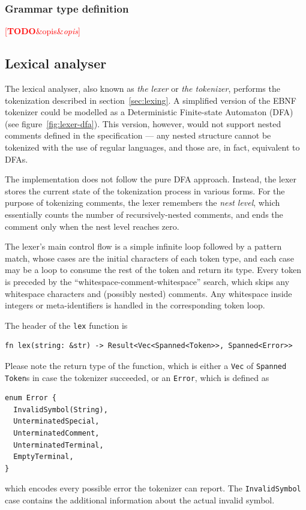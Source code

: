 \documentclass[english,engineering]{wizthesis}
\newcommand{\todo}[1]{%
  \textcolor{red}{[\textbf{TODO}\ifx&#1&{}\else{ }\fi\emph{#1}]}%
}
\begin{document}
\subsubsection*{Grammar type definition}


\todo{opis}

\subsection{Lexical analyser}

The lexical analyser, also known as \emph{the lexer} or \emph{the tokenizer},
performs the tokenization described in section~\ref{sec:lexing}. A simplified
version of the EBNF tokenizer could be modelled as a Deterministic Finite-state
Automaton (DFA) (see figure~\ref{fig:lexer-dfa}). This version, however, would
not support nested comments defined in the specification --- any nested
structure cannot be tokenized with the use of regular languages, and those are,
in fact, equivalent to DFAs.

The implementation does not follow the pure DFA approach. Instead, the lexer
stores the current state of the tokenization process in various forms. For the
purpose of tokenizing comments, the lexer remembers the \emph{nest level}, which
essentially counts the number of recursively-nested comments, and ends the
comment only when the nest level reaches zero.

The lexer's main control flow is a simple infinite loop followed by a pattern
match, whose cases are the initial characters of each token type, and each
case may be a loop to consume the rest of the token and return its type.
Every token is preceded by the ``whitespace-comment-whitespace'' search, which
skips any whitespace characters and (possibly nested) comments. Any whitespace
inside integers or meta-identifiers is handled in the corresponding token loop.

The header of the \texttt{lex} function is
\begin{verbatim}
fn lex(string: &str) -> Result<Vec<Spanned<Token>>, Spanned<Error>>
\end{verbatim}
Please note the return type of the function, which is either a \texttt{Vec} of
\texttt{Spanned} \texttt{Token}s in case the tokenizer succeeded, or an
\texttt{Error}, which is defined as
\begin{listing}[H]
  \begin{verbatim}
enum Error {
  InvalidSymbol(String),
  UnterminatedSpecial,
  UnterminatedComment,
  UnterminatedTerminal,
  EmptyTerminal,
}
  \end{verbatim}
\end{listing}
which encodes every possible error the tokenizer can report. The
\texttt{InvalidSymbol} case contains the additional information about the actual
invalid symbol.
\end{document}

